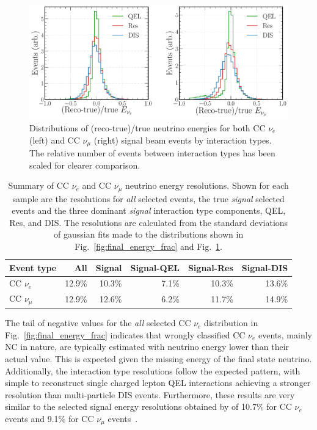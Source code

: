 \begin{figure} %
    \includegraphics[width=\textwidth]{diagrams/7-results/final_energy_frac_split.pdf}
    \caption[Distributions of (reco-true)/true neutrino energies by interaction type]
    {Distributions of (reco-true)/true neutrino energies for both CC $\nu_{e}$ (left) and CC
        $\nu_{\mu}$ (right) signal beam events by interaction types. The relative number of events
        between interaction types has been scaled for clearer comparison.}
    \label{fig:final_energy_frac_split}
\end{figure}

\begin{table}
    \begin{tabular}{lrrrrr}
        Event type     & All    & Signal & Signal-QEL & Signal-Res & Signal-DIS \\
        \midrule
        CC $\nu_{e}$   & 12.9\% & 10.3\% & 7.1\%      & 10.3\%     & 13.6\%     \\
        CC $\nu_{\mu}$ & 12.9\% & 12.6\% & 6.2\%      & 11.7\%     & 14.9\%     \\
    \end{tabular}
    \caption[Summary of CC $\nu_{e}$ and CC $\nu_{\mu}$ neutrino energy resolutions]
    {Summary of CC $\nu_{e}$ and CC $\nu_{\mu}$ neutrino energy resolutions. Shown for each sample
        are the resolutions for \emph{all} selected events, the true \emph{signal} selected events
        and the three dominant \emph{signal} interaction type components, QEL, Res, and DIS. The
        resolutions are calculated from the standard deviations of gaussian fits made to the
        distributions shown in Fig.~\ref{fig:final_energy_frac} and
        Fig.~\ref{fig:final_energy_frac_split}.}
    \label{tab:energy_resolutions}
\end{table}

The tail of negative values for the \emph{all} selected CC $\nu_{e}$ distribution in
Fig.~\ref{fig:final_energy_frac} indicates that wrongly classified CC $\nu_{e}$ events, mainly NC
in nature, are typically estimated with neutrino energy lower than their actual value. This is
expected given the missing energy of the final state neutrino. Additionally, the interaction type
resolutions follow the expected pattern, with simple to reconstruct single charged lepton QEL
interactions achieving a stronger resolution than multi-particle DIS events. Furthermore, these
results are very similar to the selected signal energy resolutions obtained by \nova of 10.7\% for
CC $\nu_{e}$ events and 9.1\% for CC $\nu_{\mu}$ events~\cite{acero2019}.

